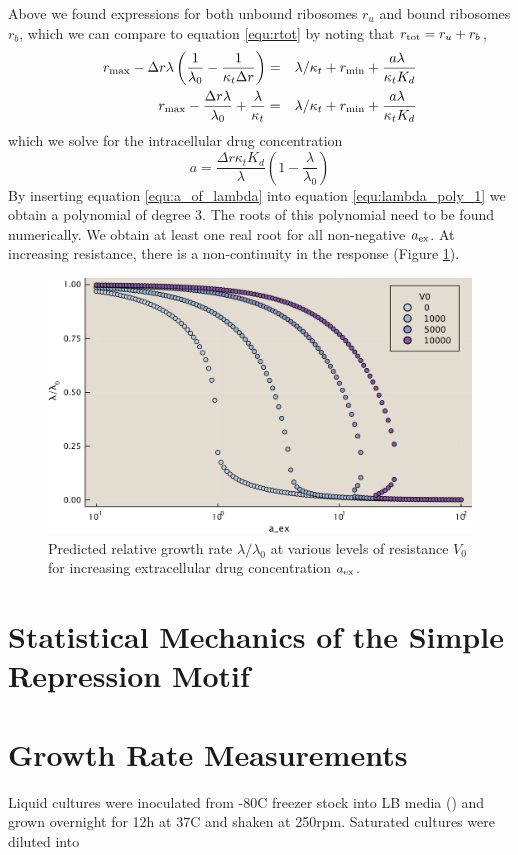  Above we found expressions for both unbound ribosomes $r_u$ and bound ribosomes $r_b$, which we can compare to equation \ref{equ:rtot} by noting that $r_{\mathrm{tot}} = r_u + r_b$,
\begin{eqnarray}
    r_{\mathrm{max}} - \Delta r\lambda \left( \frac{1}{\lambda_0} - \frac{1}{\kappa_t \Delta r} \right) &=& \lambda/\kappa_t + r_{\mathrm{min}} + {a\lambda\ \over \kappa_t K_d} \nonumber\\
    r_{\mathrm{max}} - \frac{\Delta r\lambda}{\lambda_0} + \frac{\lambda}{\kappa_t }  &=& \lambda/\kappa_t + r_{\mathrm{min}} + {a\lambda\ \over \kappa_t K_d} \nonumber
\end{eqnarray}
which we solve for the intracellular drug concentration
\begin{equation}
    a = \frac{\Delta r \kappa_t K_d}{\lambda}\left( 1-\frac{\lambda}{\lambda_0} \right)\label{equ:a_of_lambda}
\end{equation}
By inserting equation \ref{equ:a_of_lambda} into equation \ref{equ:lambda_poly_1} we obtain a polynomial of degree 3. The roots of this polynomial need to be found numerically. We obtain at least one real root for all non-negative $a_{\mathrm{ex}}$. At increasing resistance, there is a non-continuity in the response (Figure \ref{fig:model_res}).

\begin{figure}
    \centering
    \includegraphics[width=.7\linewidth]{res_model_edit.pdf}
    \caption{Predicted relative growth rate $\lambda/\lambda_0$ at various levels of resistance $V_0$ for increasing extracellular drug concentration $a_{\mathrm{ex}}$.}
    \label{fig:model_res}
\end{figure}
\section{Statistical Mechanics of the Simple Repression Motif}
\section{Growth Rate Measurements}
Liquid cultures were inoculated from -80\degree C freezer stock into LB media () and grown overnight for 12h at 37\degree C and shaken at 250rpm. Saturated cultures were diluted into 
\label{sec:gene_expression}
